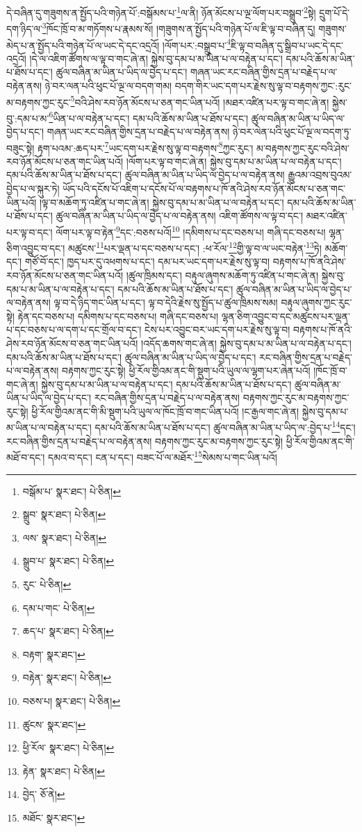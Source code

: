 དེ་བཞིན་དུ་གཟུགས་ན་སྤྱོད་པའི་གཉེན་པོ་:བསྒོམས་པ་\footnote{བསྒོམ་པ་  སྣར་ཐང་།  པེ་ཅིན། }ལ་ནི། ཉོན་མོངས་པ་ལྔ་ལོག་པར་བསྒྲུབ་\footnote{སྒྲུབ་  སྣར་ཐང་།  པེ་ཅིན། }སྟེ། དྲུག་པོ་དེ་དག་ཉིད་ལ་\footnote{ལས་  སྣར་ཐང་།  པེ་ཅིན། }ཁོང་ཁྲོ་བ་མ་གཏོགས་པ་རྣམས་སོ། །གཟུགས་ན་སྤྱོད་པའི་གཉེན་པོ་ལ་ཇི་ལྟ་བ་བཞིན་དུ། གཟུགས་མེད་པ་ན་སྤྱོད་པའི་གཉེན་པོ་ལ་ཡང་དེ་དང་འདྲའོ། །ལོག་པར་:བསྒྲུབ་པ་\footnote{སྒྲུབ་པ་  སྣར་ཐང་།  པེ་ཅིན། }ཇི་ལྟ་བ་བཞིན་དུ་སྒྲིབ་པ་ཡང་དེ་དང་འདྲའོ། །དེ་ལ་འཇིག་ཚོགས་ལ་ལྟ་བ་གང་ཞེ་ན། སྐྱེས་བུ་དམ་པ་མ་ཡིན་པ་ལ་བརྟེན་པ་དང་། དམ་པའི་ཆོས་མ་ཡིན་པ་ཐོས་པ་དང་། ཚུལ་བཞིན་མ་ཡིན་པ་ཡིད་ལ་བྱེད་པ་དང་། གཞན་ཡང་རང་བཞིན་གྱིས་དྲན་པ་བརྗེད་པ་ལ་བརྟེན་ནས། ཉེ་བར་ལན་པའི་ཕུང་པོ་ལྔ་ལ་བདག་གམ། བདག་གིར་ཡང་དག་པར་རྗེས་སུ་ལྟ་བ་བརྟགས་ཀྱང་:རུང་མ་བརྟགས་ཀྱང་རུང་\footnote{རུང་  པེ་ཅིན། }བའི་ཤེས་རབ་ཉོན་མོངས་པ་ཅན་གང་ཡིན་པའོ། །མཐར་འཛིན་པར་ལྟ་བ་གང་ཞེ་ན། སྐྱེས་བུ་:དམ་པ་མ་\footnote{དམ་པ་གང་  པེ་ཅིན། }ཡིན་པ་ལ་བརྟེན་པ་དང་། དམ་པའི་ཆོས་མ་ཡིན་པ་ཐོས་པ་དང་། ཚུལ་བཞིན་མ་ཡིན་པ་ཡིད་ལ་བྱེད་པ་དང་། གཞན་ཡང་རང་བཞིན་གྱིས་དྲན་པ་བརྗེད་པ་ལ་བརྟེན་ནས། ཉེ་བར་ལེན་པའི་ཕུང་པོ་ལྔ་ལ་བདག་ཏུ་བཟུང་སྟེ། རྟག་པའམ་:ཆད་པར་\footnote{ཆད་པ་  སྣར་ཐང་།  པེ་ཅིན། }ཡང་དག་པར་རྗེས་སུ་ལྟ་བ་བརྟགས་\footnote{བརྟག་  སྣར་ཐང་། }ཀྱང་རུང་། མ་བརྟགས་ཀྱང་རུང་བའི་ཤེས་རབ་ཉོན་མོངས་པ་ཅན་གང་ཡིན་པའོ། །ལོག་པར་ལྟ་བ་གང་ཞེ་ན། སྐྱེས་བུ་དམ་པ་མ་ཡིན་པ་ལ་བརྟེན་པ་དང་། དམ་པའི་ཆོས་མ་ཡིན་པ་ཐོས་པ་དང་། ཚུལ་བཞིན་མ་ཡིན་པ་ཡིད་ལ་བྱེད་པ་ལ་བརྟེན་ནས། རྒྱུའམ་འབྲས་བུའམ་བྱེད་པ་ལ་སྐུར་ཏེ། ཡོད་པའི་དངོས་པོ་འཇིག་པ་དངོས་པོ་ལ་བརྟགས་པ་ཁོ་ནའི་ཤེས་རབ་ཉོན་མོངས་པ་ཅན་གང་ཡིན་པའོ། །ལྟ་བ་མཆོག་ཏུ་འཛིན་པ་གང་ཞེ་ན། སྐྱེས་བུ་དམ་པ་མ་ཡིན་པ་ལ་བརྟེན་པ་དང་། དམ་པའི་ཆོས་མ་ཡིན་པ་ཐོས་པ་དང་། ཚུལ་བཞིན་མ་ཡིན་པ་ཡིད་ལ་བྱེད་པ་ལ་བརྟེན་ནས། འཇིག་ཚོགས་ལ་ལྟ་བ་དང་། མཐར་འཛིན་པར་ལྟ་བ་དང་། ལོག་པར་ལྟ་བ་རྟེན་\footnote{བརྟེན་  སྣར་ཐང་།  པེ་ཅིན། }དང་:བཅས་པའོ།\footnote{བཅས་པ།  སྣར་ཐང་།  པེ་ཅིན། } །དམིགས་པ་དང་བཅས་པ། གཞི་དང་བཅས་པ། ལྷན་ཅིག་འབྱུང་བ་དང་། མཚུངས་\footnote{ཚུངས་  སྣར་ཐང་། }པར་ལྡན་པ་དང་བཅས་པ་དང་། :ཕ་རོལ་\footnote{ཕྱི་རོལ་  སྣར་ཐང་།  པེ་ཅིན། }གྱི་ལྟ་བ་ལ་ཡང་བརྟེན་\footnote{རྟེན་  སྣར་ཐང་།  པེ་ཅིན། }ཏེ། མཆོག་དང་། གཙོ་བོ་དང་། ཁྱད་པར་དུ་འཕགས་པ་དང་། དམ་པར་ཡང་དག་པར་རྗེས་སུ་ལྟ་བ། བརྟགས་པ་ཁོ་ནའི་ཤེས་རབ་ཉོན་མོངས་པ་ཅན་གང་ཡིན་པའོ། །ཚུལ་ཁྲིམས་དང་། བརྟུལ་ཞུགས་མཆོག་ཏུ་འཛིན་པ་གང་ཞེ་ན། སྐྱེས་བུ་དམ་པ་མ་ཡིན་པ་ལ་བརྟེན་པ་དང་། དམ་པའི་ཆོས་མ་ཡིན་པ་ཐོས་པ་དང་། ཚུལ་བཞིན་མ་ཡིན་པ་ཡིད་ལ་བྱེད་པ་ལ་བརྟེན་ནས། ལྟ་བ་དེ་ཉིད་གང་ཡིན་པ་དང་། ལྟ་བ་དེའི་རྗེས་སུ་སྤྱོད་པ་ཚུལ་ཁྲིམས་སམ། བརྟུལ་ཞུགས་ཀྱང་རུང་སྟེ། རྟེན་དང་བཅས་པ། དམིགས་པ་དང་བཅས་པ། གཞི་དང་བཅས་པ། ལྷན་ཅིག་འབྱུང་བ་དང་མཚུངས་པར་ལྡན་པ་དང་བཅས་པ་ལ་དག་པ་དང་གྲོལ་བ་དང་། ངེས་པར་འབྱུང་བར་ཡང་དག་པར་རྗེས་སུ་ལྟ་བ། བརྟགས་པ་ཁོ་ནའི་ཤེས་རབ་ཉོན་མོངས་བ་ཅན་གང་ཡིན་པའོ། །འདོད་ཆགས་གང་ཞེ་ན། སྐྱེས་བུ་དམ་པ་མ་ཡིན་པ་ལ་བརྟེན་པ་དང་། དམ་པའི་ཆོས་མ་ཡིན་པ་ཐོས་པ་དང་། ཚུལ་བཞིན་མ་ཡིན་པ་ཡིད་ལ་བྱེད་པ་དང་། རང་བཞིན་གྱིས་དྲན་པ་བརྗེད་པ་ལ་བརྟེན་ནས། བརྟགས་ཀྱང་རུང་སྟེ། ཕྱི་རོལ་གྱིའམ་ནང་གི་སྡུག་པའི་ཡུལ་ལ་ལྷག་པར་ཞེན་པའོ། །ཁོང་ཁྲོ་བ་གང་ཞེ་ན། སྐྱེས་བུ་དམ་པ་མ་ཡིན་པ་ལ་བརྟེན་པ་དང་། དམ་པའི་ཆོས་མ་ཡིན་པ་ཐོས་པ་དང་། ཚུལ་བཞིན་མ་ཡིན་པ་ཡིད་ལ་བྱེད་པ་དང་། རང་བཞིན་གྱིས་དྲན་པ་བརྗེད་པ་ལ་བརྟེན་ནས། བརྟགས་ཀྱང་རུང་མ་བརྟགས་ཀྱང་རུང་སྟེ། ཕྱི་རོལ་གྱིའམ་ནང་གི་མི་སྡུག་པའི་ཡུལ་ལ་ཁོང་ཁྲོ་བ་གང་ཡིན་པའོ། །ང་རྒྱལ་གང་ཞེ་ན། སྐྱེས་བུ་དམ་པ་མ་ཡིན་པ་ལ་བརྟེན་པ་དང་། དམ་པའི་ཆོས་མ་ཡིན་པ་ཐོས་པ་དང་། ཚུལ་བཞིན་མ་ཡིན་པ་ཡིད་ལ་:བྱེད་པ་\footnote{བྱེད་  ཅོ་ནེ། }དང་། རང་བཞིན་གྱིས་དྲན་པ་བརྗེད་པ་ལ་བརྟེན་ནས། བརྟགས་ཀྱང་རུང་མ་བརྟགས་ཀྱང་རུང་སྟེ། ཕྱི་རོལ་གྱིའམ་ནང་གི་མཐོ་བ་དང་། དམའ་བ་དང་། ངན་པ་དང་། བཟང་པོ་ལ་མཐོར་\footnote{མཐོང་  སྣར་ཐང་། }སེམས་པ་གང་ཡིན་པའོ། 